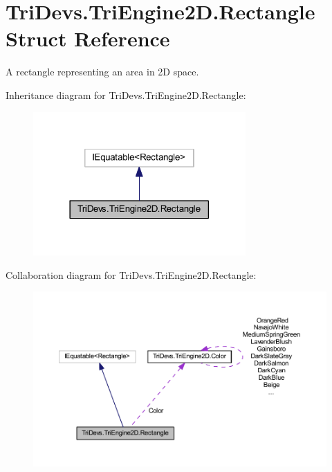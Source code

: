 \hypertarget{struct_tri_devs_1_1_tri_engine2_d_1_1_rectangle}{\section{Tri\-Devs.\-Tri\-Engine2\-D.\-Rectangle Struct Reference}
\label{struct_tri_devs_1_1_tri_engine2_d_1_1_rectangle}
}


A rectangle representing an area in 2\-D space.  




Inheritance diagram for Tri\-Devs.\-Tri\-Engine2\-D.\-Rectangle\-:
\nopagebreak
\begin{figure}[H]
\begin{center}
\leavevmode
\includegraphics[width=230pt]{struct_tri_devs_1_1_tri_engine2_d_1_1_rectangle__inherit__graph}
\end{center}
\end{figure}


Collaboration diagram for Tri\-Devs.\-Tri\-Engine2\-D.\-Rectangle\-:
\nopagebreak
\begin{figure}[H]
\begin{center}
\leavevmode
\includegraphics[width=350pt]{struct_tri_devs_1_1_tri_engine2_d_1_1_rectangle__coll__graph}
\end{center}
\end{figure}
